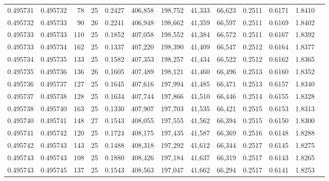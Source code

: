 \begin{tabular}{rrrrrrrrrrrrr}
0.495731 & 0.495732 &    78 &  25 &                                     0.2427 & 406,858 & 198,752 &  41,333 &  66,623 & 0.2511 & 0.6171 & 1.8410 \\
0.495732 & 0.495733 &    90 &  26 &                                     0.2241 & 406,948 & 198,662 &  41,359 &  66,597 & 0.2511 & 0.6169 & 1.8402 \\
0.495733 & 0.495733 &   110 &  25 &                                     0.1852 & 407,058 & 198,552 &  41,384 &  66,572 & 0.2511 & 0.6167 & 1.8392 \\
0.495733 & 0.495734 &   162 &  25 &                                     0.1337 & 407,220 & 198,390 &  41,409 &  66,547 & 0.2512 & 0.6164 & 1.8377 \\
0.495734 & 0.495735 &   133 &  25 &                                     0.1582 & 407,353 & 198,257 &  41,434 &  66,522 & 0.2512 & 0.6162 & 1.8365 \\
0.495735 & 0.495736 &   136 &  26 &                                     0.1605 & 407,489 & 198,121 &  41,460 &  66,496 & 0.2513 & 0.6160 & 1.8352 \\
0.495736 & 0.495737 &   127 &  25 &                                     0.1645 & 407,616 & 197,994 &  41,485 &  66,471 & 0.2513 & 0.6157 & 1.8340 \\
0.495737 & 0.495738 &   128 &  25 &                                     0.1634 & 407,744 & 197,866 &  41,510 &  66,446 & 0.2514 & 0.6155 & 1.8328 \\
0.495738 & 0.495740 &   163 &  25 &                                     0.1330 & 407,907 & 197,703 &  41,535 &  66,421 & 0.2515 & 0.6153 & 1.8313 \\
0.495740 & 0.495741 &   148 &  27 &                                     0.1543 & 408,055 & 197,555 &  41,562 &  66,394 & 0.2515 & 0.6150 & 1.8300 \\
0.495741 & 0.495742 &   120 &  25 &                                     0.1724 & 408,175 & 197,435 &  41,587 &  66,369 & 0.2516 & 0.6148 & 1.8288 \\
0.495742 & 0.495743 &   143 &  25 &                                     0.1488 & 408,318 & 197,292 &  41,612 &  66,344 & 0.2517 & 0.6145 & 1.8275 \\
0.495743 & 0.495743 &   108 &  25 &                                     0.1880 & 408,426 & 197,184 &  41,637 &  66,319 & 0.2517 & 0.6143 & 1.8265 \\
0.495743 & 0.495745 &   137 &  25 &                                     0.1543 & 408,563 & 197,047 &  41,662 &  66,294 & 0.2517 & 0.6141 & 1.8253 \\

\end{tabular}

